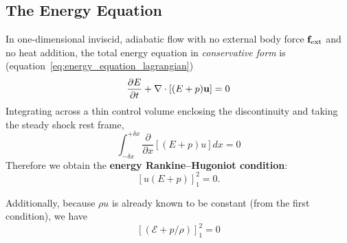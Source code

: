\subsection*{The Energy Equation}

In one-dimensional inviscid, adiabatic flow with no external body force ${\bf f}_{\rm ext}$ and no heat addition, the total energy equation in \emph{conservative form} is (equation~\ref{eq:energy_equation_lagrangian})
\begin{equation}
\frac{\partial E}{\partial t} + \nabla \cdot [(E+p){\bf u}] = 0
\end{equation}
Integrating across a thin control volume enclosing the discontinuity and taking the steady shock rest frame,
\begin{equation}
\int_{-\delta x}^{+\delta x}
\frac{\partial}{\partial x}
\left[(E+p)u \right] dx
= 0
\end{equation}
 Therefore we obtain the \textbf{energy Rankine--Hugoniot condition}:
\begin{equation}
\left[ u \left(E + p \right) \right]_{1}^{2} = 0.
\end{equation}

Additionally, because $\rho u$ is already known to be constant (from the first condition), we have
\[
\left[(\mathcal{E} + p/\rho)\right]_{1}^{2} = 0
\]

